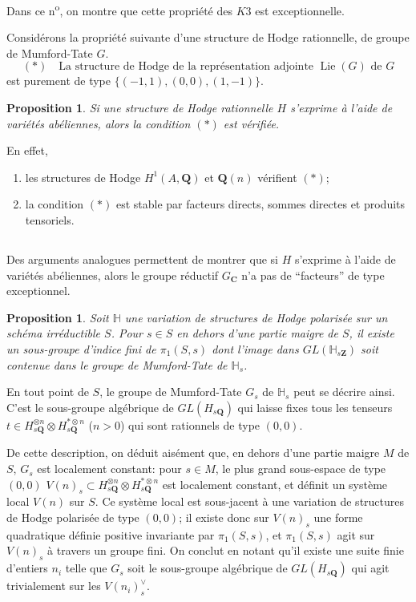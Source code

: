 \documentclass[11pt]{amsart}
\theoremstyle{plain}
\newtheorem{proposition}[theoreme]{Proposition}
\theoremstyle{definition}
\theoremstyle{remark}
\begin{document}
Dans ce n\textsuperscript{o}, on montre que cette propri\'et\'e des $K3$ est exceptionnelle.

Consid\'erons la propri\'et\'e suivante d'une structure de Hodge rationnelle, de groupe de Mumford-Tate $G$.
\begin{equation*}
(*)\quad\text{La structure de Hodge de la repr\'esentation adjointe $\operatorname{Lie}(G)$ de $G$}
\end{equation*}
est purement de type $\{(-1,1),(0,0),(1,-1)\}$.

\begin{proposition}
Si une structure de Hodge rationnelle $H$ s'exprime \`a l'aide de vari\'et\'es ab\'eliennes, alors la condition $(*)$ est v\'erifi\'ee.
\end{proposition}

En effet,
\begin{enumerate}
\item[(a)] les structures de Hodge $H^1(A,\mathbf{Q})$ et $\mathbf{Q}(n)$ v\'erifient $(*)$;
\item[(b)] la condition $(*)$ est stable par facteurs directs, sommes directes et produits tensoriels.
\end{enumerate}

\subsection*{}
Des arguments analogues permettent de montrer que si $H$ s'exprime \`a l'aide de vari\'et\'es ab\'eliennes, alors le groupe r\'eductif $G_\mathbf{C}$ n'a pas de ``facteurs'' de type exceptionnel.

\begin{proposition}
Soit $\mathbb{H}$ une variation de structures de Hodge polaris\'ee sur un sch\'ema irr\'eductible $S$. Pour $s\in S$ en dehors d'une partie maigre de $S$, il existe un sous-groupe d'indice fini de $\pi_1(S,s)$ dont l'image dans $GL(\mathbb{H}_{s\mathbf{Z}})$ soit contenue dans le groupe de Mumford-Tate de $\mathbb{H}_s$.
\end{proposition}

En tout point de $S$, le groupe de Mumford-Tate $G_s$ de $\mathbb{H}_s$ peut se d\'ecrire ainsi. C'est le sous-groupe alg\'ebrique de $GL(H_{s\mathbf{Q}})$ qui laisse fixes tous les tenseurs $t\in H_{s\mathbf{Q}}^{\otimes n}\otimes H_{s\mathbf{Q}}^{*\otimes n}$ ($n>0$) qui sont rationnels de type $(0,0)$.

De cette description, on d\'eduit ais\'ement que, en dehors d'une partie maigre $M$ de $S$, $G_s$ est localement constant: pour $s\in M$, le plus grand sous-espace de type $(0,0)$ $V(n)_s\subset H_{s\mathbf{Q}}^{\otimes n}\otimes H_{s\mathbf{Q}}^{*\otimes n}$ est localement constant, et d\'efinit un syst\`eme local $V(n)$ sur $S$. Ce syst\`eme local est sous-jacent \`a une variation de structures de Hodge polaris\'ee de type $(0,0)$; il existe donc sur $V(n)_s$ une forme quadratique d\'efinie positive invariante par $\pi_1(S,s)$, et $\pi_1(S,s)$ agit sur $V(n)_s$ \`a travers un groupe fini. On conclut en notant qu'il existe une suite finie d'entiers $n_i$ telle que $G_s$ soit le sous-groupe alg\'ebrique de $GL(H_{s\mathbf{Q}})$ qui agit trivialement sur les $V(n_i)_s^\vee$.
\end{document}
